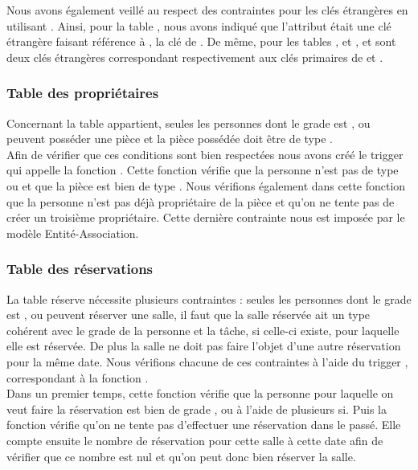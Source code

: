 	Nous avons également veillé au respect des contraintes pour les clés étrangères en utilisant . Ainsi, pour la table , nous avons indiqué que l'attribut  était une clé étrangère faisant référence à , la clé de . De même, pour les tables ,  et ,  et  sont deux clés étrangères correspondant respectivement aux clés primaires de  et .\\

\subsubsection{Table des propriétaires}
	Concernant la table appartient, seules les personnes dont le grade est ,  ou  peuvent posséder une pièce et la pièce possédée doit être de type .\\

	Afin de vérifier que ces conditions sont bien respectées nous avons créé le trigger  qui appelle la fonction . Cette fonction vérifie que la personne n'est pas de type  ou  et que la pièce est bien de type . Nous vérifions également dans cette fonction que la personne n'est pas déjà propriétaire de la pièce et qu'on ne tente pas de créer un troisième propriétaire. Cette dernière contrainte nous est imposée par le modèle Entité-Association.

\subsubsection{Table des réservations}
	La table réserve nécessite plusieurs contraintes : seules les personnes dont le grade est ,  ou  peuvent réserver une salle, il faut que la salle réservée ait un type cohérent avec le grade de la personne et la tâche, si celle-ci existe, pour laquelle elle est réservée. De plus la salle ne doit pas faire l'objet d'une autre réservation pour la même date. Nous vérifions chacune de ces contraintes à l'aide du trigger , correspondant à la fonction .\\

	Dans un premier temps, cette fonction vérifie que la personne pour laquelle on veut faire la réservation est bien de grade ,  ou  à l'aide de plusieurs si. Puis la fonction vérifie qu'on ne tente pas d'effectuer une réservation dans le passé. Elle compte ensuite le nombre de réservation pour cette salle à cette date afin de vérifier que ce nombre est nul et qu'on peut donc bien réserver la salle.\\

